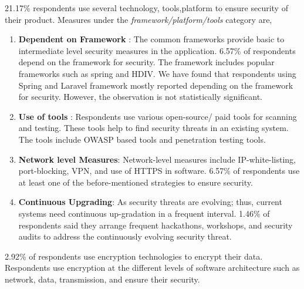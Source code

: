 21.17\% respondents use several technology, tools,platform to ensure security of their product. Measures under the \emph{framework/platform/tools} category are,
\begin{enumerate}[label=(\alph*)]

     \item \textbf{Dependent on Framework} : The common frameworks provide basic to intermediate level security measures in the application. 6.57\% of respondents depend on the framework for security. The framework includes popular frameworks such as spring and  HDIV. We have found that respondents using Spring and Laravel framework mostly reported depending on the framework for security. However, the observation is not statistically significant.
    
    \item \textbf{Use of tools} : Respondents use various open-source/ paid tools for scanning and testing. These tools help to find security threats in an existing system. The tools include OWASP based tools and  penetration testing tools.
    
    \item \textbf{Network level Measures}: Network-level measures include IP-white-listing, port-blocking, VPN, and use of HTTPS  in software. 6.57\% of respondents use at least one of the before-mentioned strategies to ensure security.

    \item \textbf{Continuous Upgrading}: As security threats are evolving; thus, current systems need continuous up-gradation in a frequent interval. 1.46\% of respondents said they arrange frequent hackathons, workshops, and security audits to address the continuously evolving security threat.

\end{enumerate}

2.92\% of respondents use encryption technologies to encrypt their data. Respondents use encryption at the different levels of software architecture such as network, data, transmission, and ensure their security.


